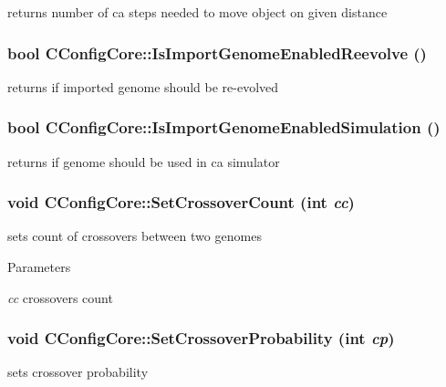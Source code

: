 \label{classCConfigCore_a70950ba2f607bbc8e31518f07e831aa5}
returns number of ca steps needed to move object on given distance \hypertarget{classCConfigCore_aac380fe0789216e072fc4cb33b8f0397}{
\subsubsection[{IsImportGenomeEnabledReevolve}]{\setlength{\rightskip}{0pt plus 5cm}bool CConfigCore::IsImportGenomeEnabledReevolve ()}}
\label{classCConfigCore_aac380fe0789216e072fc4cb33b8f0397}
returns if imported genome should be re-\/evolved \hypertarget{classCConfigCore_ab5a548edaa135b5a3da90268f9473a9b}{
\subsubsection[{IsImportGenomeEnabledSimulation}]{\setlength{\rightskip}{0pt plus 5cm}bool CConfigCore::IsImportGenomeEnabledSimulation ()}}
\label{classCConfigCore_ab5a548edaa135b5a3da90268f9473a9b}
returns if genome should be used in ca simulator \hypertarget{classCConfigCore_ab7838b68ad921f40c57528bd1a8f62be}{
\subsubsection[{SetCrossoverCount}]{\setlength{\rightskip}{0pt plus 5cm}void CConfigCore::SetCrossoverCount (int {\em cc})}}
\label{classCConfigCore_ab7838b68ad921f40c57528bd1a8f62be}
sets count of crossovers between two genomes


\begin{DoxyParams}{Parameters}
\item[{\em cc}]crossovers count \end{DoxyParams}
\hypertarget{classCConfigCore_aabac109d139d6511fa16e16d768af087}{
\subsubsection[{SetCrossoverProbability}]{\setlength{\rightskip}{0pt plus 5cm}void CConfigCore::SetCrossoverProbability (int {\em cp})}}
\label{classCConfigCore_aabac109d139d6511fa16e16d768af087}
sets crossover probability



